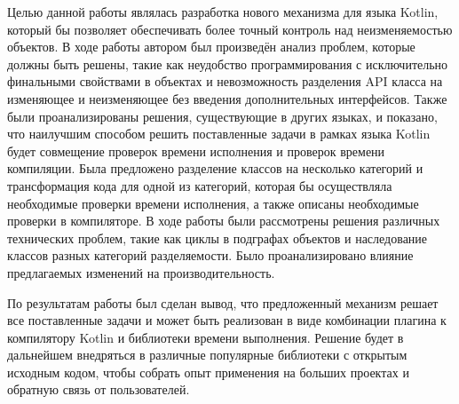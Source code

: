 \documentclass[specification,annotation,times]{itmo-student-thesis}
\begin{document}
\startconclusionpage

Целью данной работы являлась разработка нового механизма для языка Kotlin, который бы позволяет обеспечивать более точный контроль над неизменяемостью объектов.
В ходе работы автором был произведён анализ проблем, которые должны быть решены, такие как неудобство программирования с исключительно финальными свойствами в объектах и невозможность разделения API класса на изменяющее и неизменяющее без введения дополнительных интерфейсов.
Также были проанализированы решения, существующие в других языках, и показано, что наилучшим способом решить поставленные задачи в рамках языка Kotlin будет совмещение проверок времени исполнения и проверок времени компиляции.
Была предложено разделение классов на несколько категорий и трансформация кода для одной из категорий, которая бы осуществляла необходимые проверки времени исполнения, а также описаны необходимые проверки в компиляторе.
В ходе работы были рассмотрены решения различных технических проблем, такие как циклы в подграфах объектов и наследование классов разных категорий разделяемости. Было проанализировано влияние предлагаемых изменений на производительность.

По результатам работы был сделан вывод, что предложенный механизм решает все поставленные задачи и может быть реализован в виде комбинации плагина к компилятору Kotlin и библиотеки времени выполнения.
Решение будет в дальнейшем внедряться в различные популярные библиотеки с открытым исходным кодом, чтобы собрать опыт применения на больших проектах и обратную связь от пользователей.


\printmainbibliography


\end{document}
